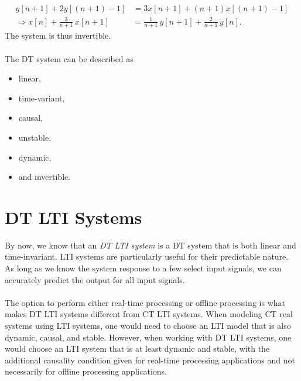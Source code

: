 \documentclass{report}
\begin{document}
\begin{solution}
\begin{align*}
        y[n+1] + 2y[(n+1)-1] &= 3x[n+1] + (n+1)x[(n+1)-1] \\
        \Longrightarrow x[n] + \frac{3}{n+1}\,x[n+1] &= \frac{1}{n+1}\,y[n+1] + \frac{2}{n+1}\,y[n].
    \end{align*}
    The system is thus invertible.
    \\ \\
    The DT system can be described as 
    \begin{itemize}
        \item linear,
        \item time-variant,
        \item causal,
        \item unstable,
        \item dynamic,
        \item and invertible.
    \end{itemize}
\end{solution}

\section{DT LTI Systems}
By now, we know that an \emph{DT LTI system} is a DT system that is both linear and time-invariant. LTI systems are particularly useful for their predictable nature. 
As long as we know the system response to a few select input signals, we can accurately predict the output for all input signals.
\\ \\
The option to perform either real-time processing or offline processing is what makes DT LTI systems different from CT LTI systems. 
When modeling CT real systems using LTI systems, one would need to choose an LTI model that is also dynamic, causal, and stable. However, 
when working with DT LTI systems, one would choose an LTI system that is at least dynamic and stable, with the additional causality condition 
given for real-time processing applications and not necessarily for offline processing applications.
\end{document}
